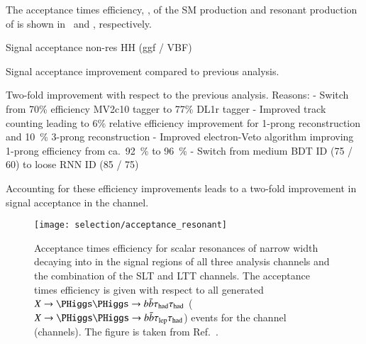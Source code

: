 The acceptance times efficiency, \AccTimesEff, of the SM \HH
production and resonant production of \HH is shown
in~ and
, respectively.

Signal acceptance non-res HH (ggf / VBF)

Signal acceptance improvement compared to previous analysis.

Two-fold improvement with respect to the previous analysis. Reasons:
- Switch from 70\% efficiency MV2c10 tagger to 77\% DL1r tagger
- Improved \tauhadvis track counting leading to 6\% relative efficiency improvement for 1-prong \tauhadvis reconstruction and \SI{10}{\percent} 3-prong \tauhadvis reconstruction
- Improved electron-Veto algorithm improving 1-prong \tauhadvis efficiency from ca.\ \SI{92}{\percent} to \SI{96}{\percent}
- Switch from medium BDT ID (75 / 60) to loose RNN ID (85 / 75)

Accounting for these efficiency improvements leads to a two-fold improvement in signal acceptance in the \hadhad channel.












\begin{figure}[htbp]
  \centering

  \texttt{[image: selection/acceptance\_resonant]}

  \caption{Acceptance times efficiency for scalar resonances of narrow
    width decaying into \HH in the signal regions of all three
    analysis channels and the combination of the \lephad SLT and LTT
    channels. The acceptance times efficiency is given with respect to
    all generated $X \to \HH \to \bbbar\hadhad$
    ($X \to \HH \to \bbbar\lephad$) events for the \hadhad channel
    (\lephad channels). The figure is taken from
    Ref.~\cite{ATLAS-CONF-2021-030}.}%
  \label{fig:signal_acceptance_resonant}

\end{figure}

